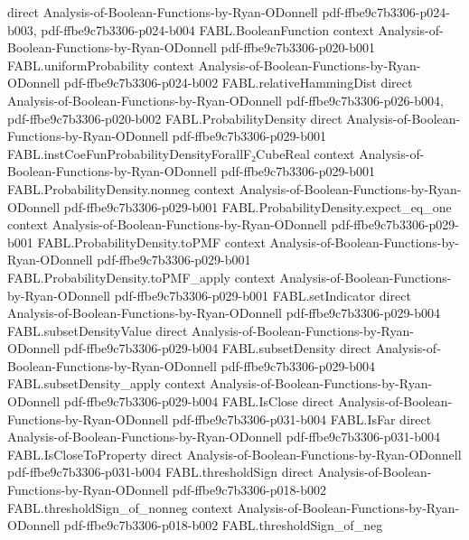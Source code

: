\begin{theorem}
  {direct}
  {Analysis-of-Boolean-Functions-by-Ryan-ODonnell}
  {pdf-ffbe9c7b3306-p024-b003,
    pdf-ffbe9c7b3306-p024-b004}
\proofstep
  {FABL.BooleanFunction}
  {context}
  {Analysis-of-Boolean-Functions-by-Ryan-ODonnell}
  {pdf-ffbe9c7b3306-p020-b001}
\proofstep
  {FABL.uniformProbability}
  {context}
  {Analysis-of-Boolean-Functions-by-Ryan-ODonnell}
  {pdf-ffbe9c7b3306-p024-b002}
\proofstep
  {FABL.relativeHammingDist}
  {direct}
  {Analysis-of-Boolean-Functions-by-Ryan-ODonnell}
  {pdf-ffbe9c7b3306-p026-b004,
    pdf-ffbe9c7b3306-p020-b002}
\proofstep
  {FABL.ProbabilityDensity}
  {direct}
  {Analysis-of-Boolean-Functions-by-Ryan-ODonnell}
  {pdf-ffbe9c7b3306-p029-b001}
\proofstep
  {FABL.instCoeFunProbabilityDensityForallF₂CubeReal}
  {context}
  {Analysis-of-Boolean-Functions-by-Ryan-ODonnell}
  {pdf-ffbe9c7b3306-p029-b001}
\proofstep
  {FABL.ProbabilityDensity.nonneg}
  {context}
  {Analysis-of-Boolean-Functions-by-Ryan-ODonnell}
  {pdf-ffbe9c7b3306-p029-b001}
\proofstep
  {FABL.ProbabilityDensity.expect_eq_one}
  {context}
  {Analysis-of-Boolean-Functions-by-Ryan-ODonnell}
  {pdf-ffbe9c7b3306-p029-b001}
\proofstep
  {FABL.ProbabilityDensity.toPMF}
  {context}
  {Analysis-of-Boolean-Functions-by-Ryan-ODonnell}
  {pdf-ffbe9c7b3306-p029-b001}
\proofstep
  {FABL.ProbabilityDensity.toPMF_apply}
  {context}
  {Analysis-of-Boolean-Functions-by-Ryan-ODonnell}
  {pdf-ffbe9c7b3306-p029-b001}
\proofstep
  {FABL.setIndicator}
  {direct}
  {Analysis-of-Boolean-Functions-by-Ryan-ODonnell}
  {pdf-ffbe9c7b3306-p029-b004}
\proofstep
  {FABL.subsetDensityValue}
  {direct}
  {Analysis-of-Boolean-Functions-by-Ryan-ODonnell}
  {pdf-ffbe9c7b3306-p029-b004}
\proofstep
  {FABL.subsetDensity}
  {direct}
  {Analysis-of-Boolean-Functions-by-Ryan-ODonnell}
  {pdf-ffbe9c7b3306-p029-b004}
\proofstep
  {FABL.subsetDensity_apply}
  {context}
  {Analysis-of-Boolean-Functions-by-Ryan-ODonnell}
  {pdf-ffbe9c7b3306-p029-b004}
\proofstep
  {FABL.IsClose}
  {direct}
  {Analysis-of-Boolean-Functions-by-Ryan-ODonnell}
  {pdf-ffbe9c7b3306-p031-b004}
\proofstep
  {FABL.IsFar}
  {direct}
  {Analysis-of-Boolean-Functions-by-Ryan-ODonnell}
  {pdf-ffbe9c7b3306-p031-b004}
\proofstep
  {FABL.IsCloseToProperty}
  {direct}
  {Analysis-of-Boolean-Functions-by-Ryan-ODonnell}
  {pdf-ffbe9c7b3306-p031-b004}
\proofstep
  {FABL.thresholdSign}
  {direct}
  {Analysis-of-Boolean-Functions-by-Ryan-ODonnell}
  {pdf-ffbe9c7b3306-p018-b002}
\proofstep
  {FABL.thresholdSign_of_nonneg}
  {context}
  {Analysis-of-Boolean-Functions-by-Ryan-ODonnell}
  {pdf-ffbe9c7b3306-p018-b002}
\proofstep
  {FABL.thresholdSign_of_neg}

\end{theorem}
